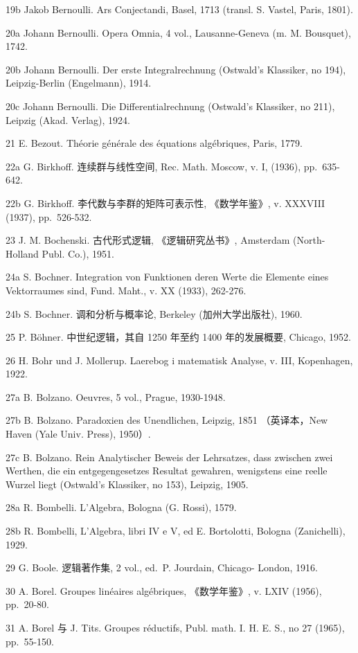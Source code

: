 19b Jakob Bernoulli. Ars Conjectandi, Basel, 1713 (transl. S. Vastel, Paris, 1801).

20a Johann Bernoulli. Opera Omnia, 4 vol., Lausanne-Geneva (m. M. Bousquet), 1742.

20b Johann Bernoulli. Der erste Integralrechnung (Ostwald's Klassiker, no 194), Leipzig-Berlin (Engelmann), 1914.

20c Johann Bernoulli. Die Differentialrechnung (Ostwald's Klassiker, no 211), Leipzig (Akad. Verlag), 1924.

21 E. Bezout. Théorie générale des équations algébriques, Paris, 1779.

22a G. Birkhoff. 连续群与线性空间, Rec. Math. Moscow, v. I, (1936), pp.~635-642.

22b G. Birkhoff. 李代数与李群的矩阵可表示性, 《数学年鉴》, v. XXXVIII (1937), pp.~526-532.

23 J. M. Bochenski. 古代形式逻辑, 《逻辑研究丛书》, Amsterdam (North-Holland Publ. Co.), 1951.

24a S. Bochner. Integration von Funktionen deren Werte die Elemente eines Vektorraumes sind, Fund. Maht., v. XX (1933), 262-276.

24b S. Bochner. 调和分析与概率论, Berkeley (加州大学出版社), 1960.

25 P. Böhner. 中世纪逻辑，其自 1250 年至约 1400 年的发展概要, Chicago, 1952.

26 H. Bohr und J. Mollerup. Laerebog i matematisk Analyse, v. III, Kopenhagen, 1922.

27a B. Bolzano. Oeuvres, 5 vol., Prague, 1930-1948.

27b B. Bolzano. Paradoxien des Unendlichen, Leipzig, 1851 （英译本，New Haven (Yale Univ. Press), 1950）.

27c B. Bolzano. Rein Analytischer Beweis der Lehrsatzes, dass zwischen zwei Werthen, die ein entgegengesetzes Resultat gewahren, wenigstens eine reelle Wurzel liegt (Ostwald's Klassiker, no 153), Leipzig, 1905.

28a R. Bombelli. L'Algebra, Bologna (G. Rossi), 1579.

28b R. Bombelli, L'Algebra, libri IV e V, ed E. Bortolotti, Bologna (Zanichelli), 1929.

29 G. Boole. 逻辑著作集, 2 vol., ed.~P. Jourdain, Chicago- London, 1916.

30 A. Borel. Groupes linéaires algébriques, 《数学年鉴》, v. LXIV (1956), pp.~20-80.

31 A. Borel 与 J. Tits. Groupes réductifs, Publ. math. I. H. E. S., no 27 (1965), pp.~55-150.

